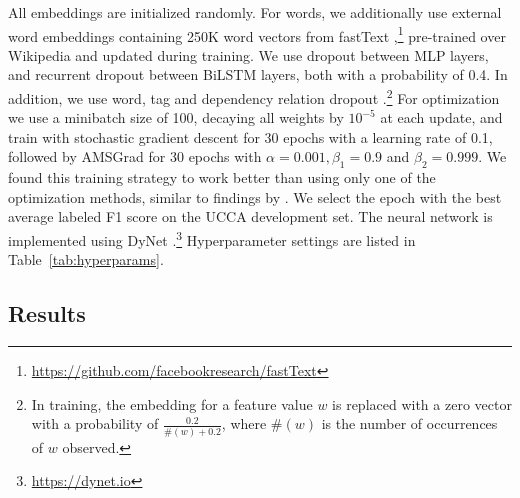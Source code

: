 \documentclass[11pt,a4paper]{article}
\newcommand{\oa}[1]{\footnote{\color{red}OA: #1}}
\DeclareMathOperator*{\argmax}{argmax}
\begin{document}
All embeddings are initialized randomly.
For words, we additionally use external word embeddings containing 250K word vectors from fastText
\cite{bojanowski2016enriching},\footnote{\url{https://github.com/facebookresearch/fastText}}
pre-trained over Wikipedia and updated during training.
We use dropout \cite{srivastava2014dropout} between MLP layers, and recurrent dropout
\cite{NIPS2016_6241} between BiLSTM layers, both with a probability of 0.4.
In addition, we use word, tag and dependency relation dropout \cite{kiperwasser2016simple}.\footnote{In
training, the embedding for a feature value $w$ is replaced with a zero vector
with a probability of $\frac{0.2}{\#(w)+0.2}$, where $\#(w)$ is the number of occurrences of
$w$ observed.}
For optimization we use a minibatch size of 100, decaying all weights by $10^{-5}$ at each update,
and train with stochastic gradient descent for 30 epochs with a learning
rate of 0.1, followed by AMSGrad \cite{j.2018on} for 30 epochs with
$\alpha=0.001,\beta_1=0.9$ and $\beta_2=0.999$.
We found this training strategy to work better than using only one of the optimization methods,
similar to findings by \citet{keskar2017improving}.
We select the epoch with the best average labeled F1 score on the UCCA development set.
The neural network is implemented using DyNet \cite{neubig2017dynet}.\footnote{\url{https://dynet.io}}
Hyperparameter settings are listed in Table~\ref{tab:hyperparams}.

%
%



\subsection{Results}\label{sec:results}
\end{document}
